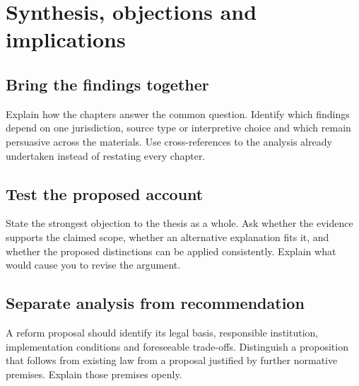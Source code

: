 \chapter{Synthesis, objections and implications}\label{ch:synthesis}
\section{Bring the findings together}
Explain how the chapters answer the common question. Identify which findings
depend on one jurisdiction, source type or interpretive choice and which remain
persuasive across the materials. Use cross-references to the analysis already
undertaken instead of restating every chapter.

\section{Test the proposed account}
State the strongest objection to the thesis as a whole. Ask whether the evidence
supports the claimed scope, whether an alternative explanation fits it, and
whether the proposed distinctions can be applied consistently. Explain what
would cause you to revise the argument.

\section{Separate analysis from recommendation}
A reform proposal should identify its legal basis, responsible institution,
implementation conditions and foreseeable trade-offs. Distinguish a proposition
that follows from existing law from a proposal justified by further normative
premises. Explain those premises openly.

